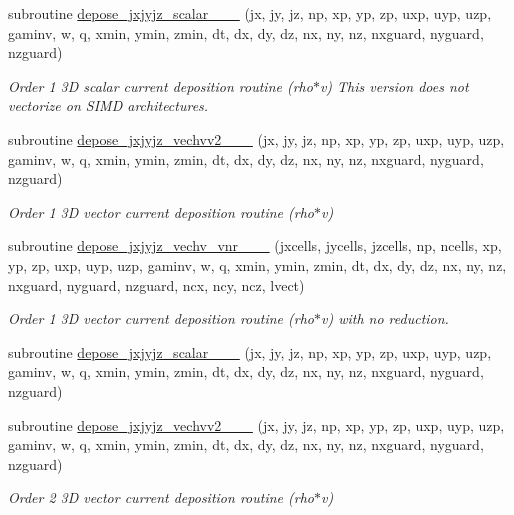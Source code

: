 \begin{DoxyCompactItemize}
subroutine \hyperlink{current__deposition_8_f90_a7347c7791083dae1b946cdbdce60602f}{depose\+\_\+jxjyjz\+\_\+scalar\+\_\+\_\+\_} (jx, jy, jz, np, xp, yp, zp, uxp, uyp, uzp, gaminv, w, q, xmin, ymin, zmin,                                       dt, dx, dy, dz, nx, ny, nz, nxguard, nyguard, nzguard)
\begin{DoxyCompactList}\small\item\em Order 1 3D scalar current deposition routine (rho$\ast$v) This version does not vectorize on S\+I\+MD architectures. \end{DoxyCompactList}\item 
subroutine \hyperlink{current__deposition_8_f90_a084ed42e79187e34df1e5e49cb589e87}{depose\+\_\+jxjyjz\+\_\+vechvv2\+\_\+\_\+\_} (jx, jy, jz, np, xp, yp, zp, uxp, uyp, uzp, gaminv, w, q, xmin, ymin, zmin,                                       dt, dx, dy, dz, nx, ny, nz, nxguard, nyguard, nzguard)
\begin{DoxyCompactList}\small\item\em Order 1 3D vector current deposition routine (rho$\ast$v) \end{DoxyCompactList}\item 
subroutine \hyperlink{current__deposition_8_f90_a640df01330ec2f2b5ffcb43938a71db5}{depose\+\_\+jxjyjz\+\_\+vechv\+\_\+vnr\+\_\+\_\+\_} (jxcells, jycells, jzcells, np, ncells, xp, yp, zp,                                   uxp, uyp, uzp, gaminv, w, q, xmin, ymin, zmin,                                       dt, dx, dy, dz, nx, ny, nz, nxguard, nyguard, nzguard, ncx, ncy, ncz, lvect)
\begin{DoxyCompactList}\small\item\em Order 1 3D vector current deposition routine (rho$\ast$v) with no reduction. \end{DoxyCompactList}\item 
subroutine \hyperlink{current__deposition_8_f90_a3b2c43f71118a3d22ad1d1fea9494fa4}{depose\+\_\+jxjyjz\+\_\+scalar\+\_\+\_\+\_} (jx, jy, jz, np, xp, yp, zp, uxp, uyp, uzp, gaminv, w, q, xmin, ymin, zmin,                                       dt, dx, dy, dz, nx, ny, nz, nxguard, nyguard, nzguard)
\item 
subroutine \hyperlink{current__deposition_8_f90_a82878814b59bae3273786c1c0e92deb6}{depose\+\_\+jxjyjz\+\_\+vechvv2\+\_\+\_\+\_} (jx, jy, jz, np, xp, yp, zp, uxp, uyp, uzp, gaminv, w, q, xmin, ymin, zmin,                                       dt, dx, dy, dz, nx, ny, nz, nxguard, nyguard, nzguard)
\begin{DoxyCompactList}\small\item\em Order 2 3D vector current deposition routine (rho$\ast$v) \end{DoxyCompactList}\item 

\end{DoxyCompactItemize}
